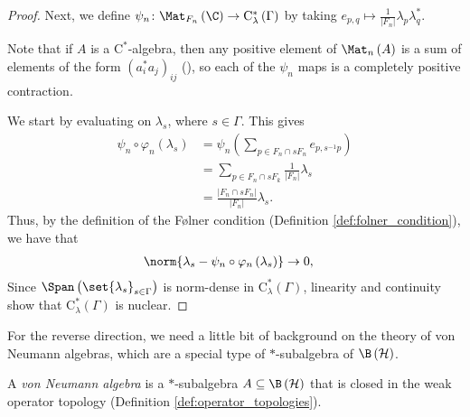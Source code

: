 \begin{proof}
  Next, we define $\psi_n\colon \Mat_{F_n}\left( \C \right)\rightarrow \mathrm{C}^{\ast}_{\lambda}\left( \Gamma \right)$ by taking $e_{p,q} \mapsto \frac{1}{\left\vert F_n \right\vert}\lambda_{p}\lambda_{q}^{\ast}$.\newline

  Note that if $A$ is a $\mathrm{C}^{\ast}$-algebra, then any positive element of $\Mat_n\left( A \right)$ is a sum of elements of the form $\left( a_i^{\ast}a_j \right)_{ij}$ (\cite[Lemma 3.13]{completely_bounded_maps_and_operator_algebras}), so each of the $\psi_n$ maps is a completely positive contraction.\newline

  We start by evaluating on $\lambda_s$, where $s\in\Gamma$. This gives
  \begin{align*}
    \psi_n\circ\varphi_n\left( \lambda_s \right) &= \psi_n\left( \sum_{p\in F_n\cap sF_n}e_{p,s^{-1}p} \right)\\
                                                 &= \sum_{p\in F_n\cap sF_k}\frac{1}{\left\vert F_n \right\vert}\lambda_s\\
                                                 &= \frac{\left\vert F_n \cap sF_n \right\vert}{\left\vert F_n \right\vert}\lambda_s.
  \end{align*}
  Thus, by the definition of the Følner condition (Definition \ref{def:folner_condition}), we have that
  \begin{align*}
    \norm{\lambda_s - \psi_n\circ\varphi_n\left( \lambda_s \right)} &\rightarrow 0,
  \end{align*}
  Since $\Span\left( \set{\lambda_s}_{s\in\Gamma} \right)$ is norm-dense in $\mathrm{C}^{\ast}_{\lambda}\left( \Gamma \right)$, linearity and continuity show that $\mathrm{C}^{\ast}_{\lambda}\left( \Gamma \right)$ is nuclear.
\end{proof}
For the reverse direction, we need a little bit of background on the theory of von Neumann algebras, which are a special type of $\ast$-subalgebra of $\B\left( \mathcal{H} \right)$.
\begin{definition}
  A \textit{von Neumann algebra} is a $\ast$-subalgebra $A\subseteq \B\left( \mathcal{H} \right)$ that is closed in the weak operator topology (Definition \ref{def:operator_topologies}).
\end{definition}
